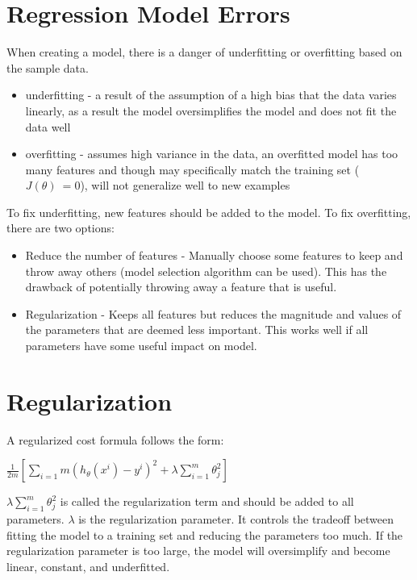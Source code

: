\documentclass[12pt, twoside, a4paper]{book}
\begin{document}
\section{Regression Model Errors}

When creating a model, there is a danger of underfitting or overfitting based on the sample data.

\begin{itemize}
	\item underfitting - a result of the assumption of a high bias that the data varies linearly, as a result the model oversimplifies the model and does not fit the data well
	\item overfitting -  assumes high variance in the data, an overfitted model has too many features and though may specifically match the training set ($J(\theta)~= 0$), will not generalize well to new examples
\end{itemize}

To fix underfitting, new features should be added to the model. To fix overfitting, there are two options:

\begin{itemize}
	\item Reduce the number of features - Manually choose some features to keep and throw away others (model selection algorithm can be used). This has the drawback of potentially throwing away a feature that is useful.
	\item Regularization - Keeps all features but reduces the magnitude and values of the parameters that are deemed less important. This works well if all parameters have some useful impact on model.
\end{itemize}

\section{Regularization}

A regularized cost formula follows the form:

$\frac{1}{2m}[\sum_{i=1}{m}(h_{\theta}(x^i)-y^i)^2+\lambda\sum_{i=1}^{m}\theta_j^2]$


$\lambda\sum_{i=1}^m\theta^2_j$ is called the regularization term and should be added to all parameters. $\lambda$ is the regularization parameter. It controls the tradeoff between fitting the model to a training set and reducing the parameters too much. If the regularization parameter is too large, the model will oversimplify and become linear, constant, and underfitted.
\end{document}
